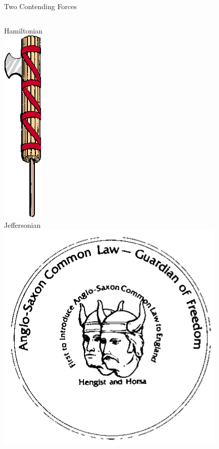 \begin{frame}{Two Contending Forces}
    \begin{columns}[c]
            \centering
            \large{Hamiltonian} \\
            \vspace{15pt}
            \includegraphics[height=0.60\textheight]{img/fasces.png} \\
        \column{0.5\textheight}
            \centering
            \large{Jeffersonian} \\
            \vspace{15pt}
            \pause
            \includegraphics[height=0.60\textheight]{img/hh-coin.png} \\
    \end{columns}
\end{frame}

